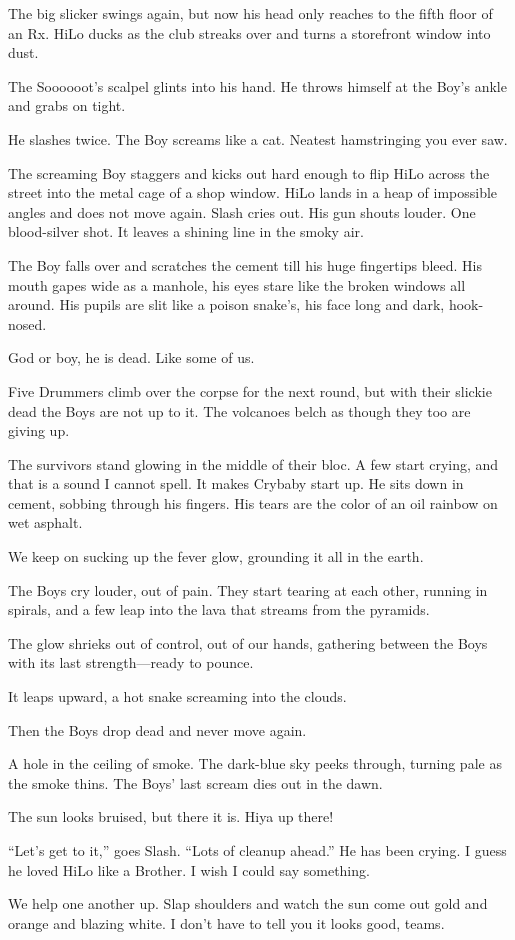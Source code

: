The big slicker swings again, but now his head only reaches to the fifth floor of an Rx. HiLo ducks as the club streaks over and turns a storefront window into dust.

The Soooooot's scalpel glints into his hand. He throws himself at the Boy's ankle and grabs on tight.

He slashes twice. The Boy screams like a cat. Neatest hamstringing you ever saw.

The screaming Boy staggers and kicks out hard enough to flip HiLo across the street into the metal cage of a shop window. HiLo lands in a heap of impossible angles and does not move again. Slash cries out. His gun shouts louder. One blood-silver shot. It leaves a shining line in the smoky air.

The Boy falls over and scratches the cement till his huge fingertips bleed. His mouth gapes wide as a manhole, his eyes stare like the broken windows all around. His pupils are slit like a poison snake's, his face long and dark, hook-nosed.

God or boy, he is dead. Like some of us.

Five Drummers climb over the corpse for the next round, but with their slickie dead the Boys are not up to it. The volcanoes belch as though they too are giving up.

The survivors stand glowing in the middle of their bloc. A few start crying, and that is a sound I cannot spell. It makes Crybaby start up. He sits down in cement, sobbing through his fingers. His tears are the color of an oil rainbow on wet asphalt.

We keep on sucking up the fever glow, grounding it all in the earth.

The Boys cry louder, out of pain. They start tearing at each other, running in spirals, and a few leap into the lava that streams from the pyramids.

The glow shrieks out of control, out of our hands, gathering between the Boys with its last strength—ready to pounce.

It leaps upward, a hot snake screaming into the clouds.

Then the Boys drop dead and never move again.

A hole in the ceiling of smoke. The dark-blue sky peeks through, turning pale as the smoke thins. The Boys' last scream dies out in the dawn.

The sun looks bruised, but there it is. Hiya up there!

“Let's get to it,” goes Slash. “Lots of cleanup ahead.” He has been crying. I guess he loved HiLo like a Brother. I wish I could say something.

We help one another up. Slap shoulders and watch the sun come out gold and orange and blazing white. I don't have to tell you it looks good, teams.